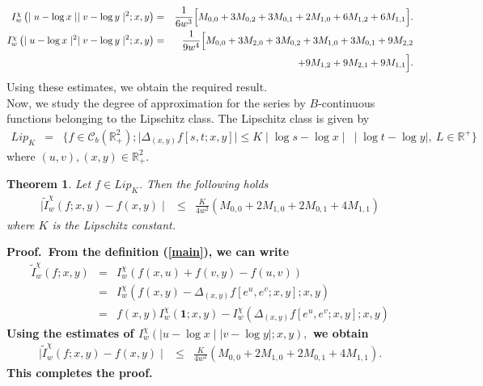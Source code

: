 \documentclass[12pt]{article}
\newtheorem{thm}{Theorem}[section]
\begin{document}
{\begin{eqnarray*}
 I_{w}^{\chi}\left(\mid u-\log x\mid\mid v-\log y\mid^{2};x,y\right)&=&\frac{1}{6w^{3}}\Big[M_{0,0}+3M_{0,2}+3M_{0,1}+2M_{1,0}+6M_{1,2}+6M_{1,1}\Big].\\
I_{w}^{\chi} \left(\mid u-\log x\mid^{2}\mid v-\log y\mid^{2};x,y\right)&=&\frac{1}{9w^{4}}\Big[M_{0,0}+3M_{2,0}+3M_{0,2}+3M_{1,0}+3M_{0,1}+9M_{2,2}
\\&& \hspace{0.9cm} +9M_{1,2}+9M_{2,1}+9M_{1,1}\Big].
 \end{eqnarray*}
Using these estimates, we obtain the required result.\\

Now, we study the degree of approximation for the series by $B$-continuous
functions belonging to the Lipschitz class. The Lipschitz class is given by
\begin{eqnarray*}
Lip_{K}&=&\{f\in \mathcal{C}_{b}(\mathbb{R}^{2}_{+});\mid\Delta_{(x,y)}f[s,t;x,y]\mid\leq K \mid \log s- \log x \mid\  \mid \log t - \log y \mid, \ L \in \mathbb{R}^{+} \}
\end{eqnarray*}
where $(u,v),(x,y) \in \mathbb{R}^{2}_{+}.$
\begin{thm} Let $f \in Lip_{K}$. Then the following holds
\begin{eqnarray*}
\mid \tilde{I}^{\chi}_{w}(f;x,y)-f(x,y)\mid &\leq & \frac{K}{4w^{2}}\left( M_{0,0}+2M_{1,0}+2M_{0,1}+4M_{1,1}\right)
\end{eqnarray*}
where $K$ is the Lipschitz constant.
 \end{thm}

\noindent\bf{Proof.}\rm \ From the definition (\ref{main}), we can write
\begin{eqnarray*}
\tilde{I}^{\chi}_{w}(f;x,y) &=& I_{w}^{\chi}\left( f(x,u)+f(v,y)-f(u,v)\right)\\
&=&I_{w}^{\chi}\left(f(x,y)-\Delta_{(x,y)}f[e^u,e^v;x,y];x,y\right)\\
&=& f(x,y) I_{w}^{\chi}(\textbf{1};x,y)-I_{w}^{\chi}\left(\Delta_{(x,y)}f[e^u,e^v;x,y];x,y\right)
\end{eqnarray*}
Using the estimates of $I_{w}^{\chi} \left( \mid u-\log x\mid \mid v-\log y\mid;x,y\right),$ we obtain
\begin{eqnarray*}
\mid \tilde{I}^{\chi}_{w}(f;x,y)-f(x,y)\mid &\leq&\frac{K}{4w^{2}}\left( M_{0,0}+2M_{1,0}+2M_{0,1}+4M_{1,1}\right).
\end{eqnarray*}
This completes the proof.

}
\end{document}
